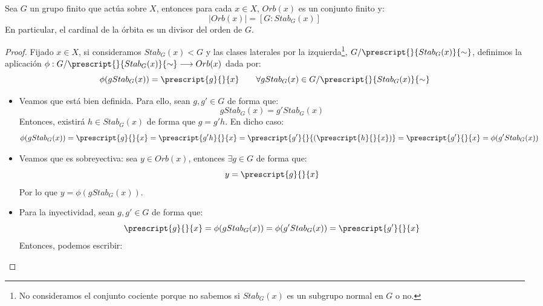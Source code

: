 \begin{prop}\label{prop:orb_stab}
   Sea $G$ un grupo finito que actúa sobre $X$, entonces para cada $x\in X$, $Orb(x)$ es un conjunto finito y:
   \begin{equation*}
       |Orb(x)| = [G:Stab_G(x)]
   \end{equation*}
   En particular, el cardinal de la órbita es un divisor del orden de $G$.
   \begin{proof}
       Fijado $x\in X$, si consideramos $Stab_G(x) < G$ y las clases laterales por la izquierda\footnote{No consideramos el conjunto cociente porque no sabemos si $Stab_G(x)$ es un subgrupo normal en $G$ o no.}, $G/\prescript{}{Stab_G(x)}{\sim}$, definimos la aplicación $\phi:G/\prescript{}{Stab_G(x)}{\sim}\longrightarrow Orb(x)$ dada por:
       \begin{equation*}
           \phi(gStab_G(x)) = \prescript{g}{}{x} \qquad \forall gStab_G(x) \in G/\prescript{}{Stab_G(x)}{\sim}
       \end{equation*}
       \begin{itemize}
           \item Veamos que está bien definida. Para ello, sean $g,g' \in G$ de forma que:
               \begin{equation*}
                   gStab_G(x) = g'Stab_G(x)
               \end{equation*}
               Entonces, existirá $h\in Stab_G(x)$ de forma que $g = g'h$. En dicho caso:
               \begin{equation*}
                   \phi(gStab_G(x)) = \prescript{g}{}{x} = \prescript{g'h}{}{x} = \prescript{g'}{}{(\prescript{h}{}{x})} = \prescript{g'}{}{x} = \phi(g'Stab_G(x))
               \end{equation*}
           \item Veamos que es sobreyectiva: sea $y\in Orb(x)$, entonces $\exists g\in G$ de forma que:
               \begin{equation*}
                   y = \prescript{g}{}{x}
               \end{equation*}
               Por lo que $y = \phi(gStab_G(x))$.
           \item Para la inyectividad, sean $g,g'\in G$ de forma que:
               \begin{equation*}
                   \prescript{g}{}{x} = \phi(gStab_G(x)) = \phi(g'Stab_G(x)) = \prescript{g'}{}{x}
               \end{equation*}
               Entonces, podemos escribir:

\end{itemize}
\end{proof}
\end{prop}
